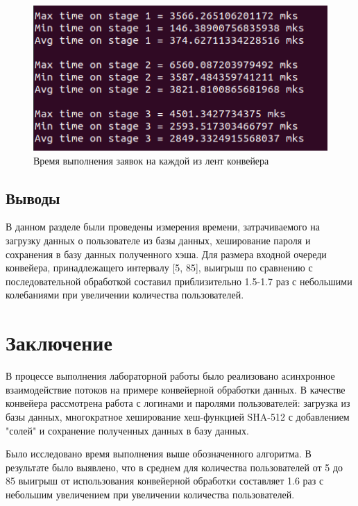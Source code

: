 \documentclass[a4paper,oneside,14pt]{extreport}
\begin{document}
\captionsetup{singlelinecheck=true}
\begin{figure}[H]
	\centering
	\includegraphics[width=0.65\linewidth]{images/maxmintime}
	\caption{Время выполнения заявок на каждой из лент конвейера}
	\label{fig:maxmintime}
\end{figure}


\section{Выводы}
В данном разделе были проведены измерения времени, затрачиваемого на загрузку данных о пользователе из базы данных, хеширование пароля и сохранения в базу данных полученного хэша.
Для размера входной очереди конвейера, принадлежащего интервалу [5, 85], выигрыш по сравнению с последовательной обработкой составил приблизительно 1.5-1.7 раз с небольшими колебаниями при увеличении количества пользователей.
\newpage

\chapter*{Заключение}
В процессе выполнения лабораторной работы было реализовано асинхронное взаимодействие потоков на примере конвейерной обработки данных. В качестве конвейера рассмотрена работа с логинами и паролями пользователей: загрузка из базы данных, многократное хеширование хеш-функцией SHA-512 с добавлением "солей" и сохранение полученных данных в базу данных.

Было исследовано время выполнения выше обозначенного алгоритма. В результате было выявлено, что в среднем для количества пользователей от 5 до 85 выигрыш от использования конвейерной обработки составляет 1.6 раз с небольшим увеличением при увеличении количества пользователей.

\newpage
{}



\nocite{*}
\end{document}
